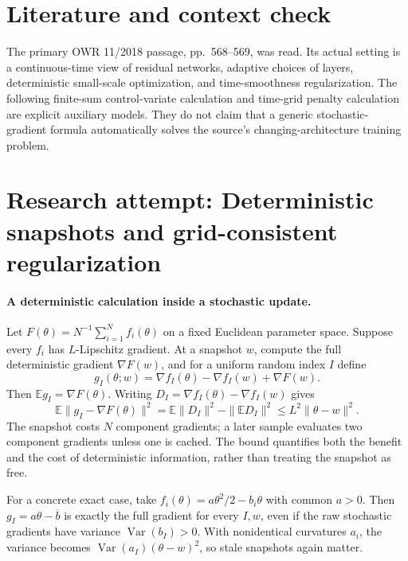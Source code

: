 \documentclass[11pt]{article}
\begin{document}
\section{Literature and context check}
The primary OWR 11/2018 passage, pp.~568--569, was read. Its actual setting is a continuous-time view of residual networks, adaptive choices of layers, deterministic small-scale optimization, and time-smoothness regularization. The following finite-sum control-variate calculation and time-grid penalty calculation are explicit auxiliary models. They do not claim that a generic stochastic-gradient formula automatically solves the source's changing-architecture training problem.
\section{Research attempt: Deterministic snapshots and grid-consistent regularization}

\paragraph{A deterministic calculation inside a stochastic update.}
Let $F(\theta)=N^{-1}\sum_{i=1}^N f_i(\theta)$ on a fixed Euclidean parameter space. Suppose every $f_i$ has $L$-Lipschitz gradient. At a snapshot $w$, compute the full deterministic gradient $\nabla F(w)$, and for a uniform random index $I$ define
\[
 g_I(\theta;w)=\nabla f_I(\theta)-\nabla f_I(w)+\nabla F(w).
\]
Then $\mathbb Eg_I=\nabla F(\theta)$. Writing $D_I=\nabla f_I(\theta)-\nabla f_I(w)$ gives
\[
 \mathbb E\|g_I-\nabla F(\theta)\|^2
 =\mathbb E\|D_I\|^2-\|\mathbb ED_I\|^2
 \le L^2\|\theta-w\|^2.
\]
The snapshot costs $N$ component gradients; a later sample evaluates two component gradients unless one is cached. The bound quantifies both the benefit and the cost of deterministic information, rather than treating the snapshot as free.

For a concrete exact case, take $f_i(\theta)=a\theta^2/2-b_i\theta$ with common $a>0$. Then $g_I=a\theta-\overline b$ is exactly the full gradient for every $I,w$, even if the raw stochastic gradients have variance $\operatorname{Var}(b_I)>0$. With nonidentical curvatures $a_i$, the variance becomes $\operatorname{Var}(a_I)(\theta-w)^2$, so stale snapshots again matter.
\end{document}
